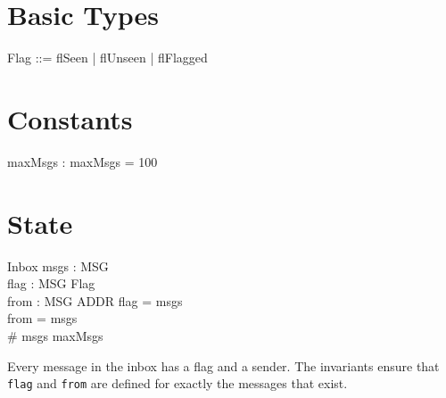 \documentclass{article}
\begin{document}
\section{Basic Types}

\begin{zed}
\end{zed}

\begin{zed}
  Flag ::= flSeen | flUnseen | flFlagged
\end{zed}

\section{Constants}

\begin{axdef}
  maxMsgs : \nat
\where
  maxMsgs = 100
\end{axdef}

\section{State}

\begin{schema}{Inbox}
  msgs : \power MSG \\
  flag : MSG \pfun Flag \\
  from : MSG \pfun ADDR
\where
  \dom flag = msgs \\
  \dom from = msgs \\
  \# msgs \leq maxMsgs
\end{schema}

Every message in the inbox has a flag and a sender.
The invariants ensure that \texttt{flag} and \texttt{from}
are defined for exactly the messages that exist.
\end{document}
